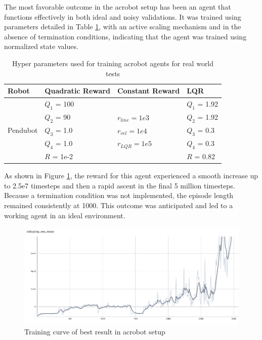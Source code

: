 The most favorable outcome in the acrobot setup has been an agent that functions effectively in both ideal and noisy validations. It was trained using parameters detailed in Table \ref{tab:training_parameters_real_world_acrobot}, with an active scaling mechanism and in the absence of termination conditions, indicating that the agent was trained using normalized state values.

\begin{table}[H]
  \centering
  \begin{tabular}{p{2cm} | p{3cm} | p{3cm} | p{3cm}}
  Robot & Quadratic Reward  & Constant Reward & LQR\\
  \hline
  \multirow{5}{*}{Pendubot} & \(Q_1\) = 100 &  & \(Q_1\) = 1.92\\
  & \(Q_2\) = 90  & \(r_{line}=1e3\) & \(Q_2\) = 1.92\\
  & \(Q_3\) = 1.0  & \(r_{vel}=1e4\) & \(Q_3\) = 0.3\\
  & \(Q_4\) = 1.0  & \(r_{LQR}=1e5\)& \(Q_4\) = 0.3\\
  & \(R\) = 1e-2  & & \(R\) = 0.82\\
  \end{tabular}
 \caption{Hyper parameters used for training acrobot agents for real world tests}
 \label{tab:training_parameters_real_world_acrobot}
\end{table}

As shown in Figure \ref{fig:acrobot_training_curve}, the reward for this agent experienced a smooth increase up to 2.5e7 timesteps and then a rapid ascent in the final 5 million timesteps. Because a termination condition was not implemented, the episode length remained consistently at 1000. This outcome was anticipated and led to  a working agent in an ideal environment.

\begin{figure}[H]
    \centering
    \includegraphics[width=1.0\linewidth]{figures/hardware_result/acrobot_learning_curve_real_world.png}
    \caption{Training curve of best result in acrobot setup}
    \label{fig:acrobot_training_curve}
\end{figure}

